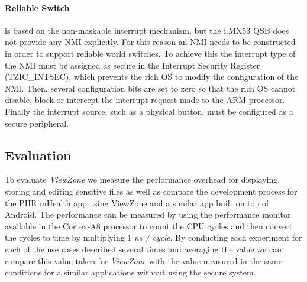 \paragraph{Reliable Switch} is based on the non-maskable interrupt mechanism, but the i.MX53 QSB does not provide any \ac{NMI} explicitly. For this reason an \ac{NMI} needs to be constructed in order to support reliable world switches. To achieve this the interrupt type of the \ac{NMI} must be assigned as secure in the Interrupt Security Register (TZIC\_INTSEC), which prevents the rich OS to modify the configuration of the \ac{NMI}. Then, several configuration bits are set to zero so that the rich OS cannot disable, block or intercept the interrupt request made to the ARM processor. Finally the interrupt source, such as a physical button, must be configured as a secure peripheral.


\subsection{Evaluation}


To evaluate \emph{ViewZone} we measure the performance overhead for displaying, storing and editing sensitive files as well as compare the development process for the PHR mHealth app using ViewZone and a similar app built on top of Android. The performance can be measured by using the performance monitor available in the Cortex-A8 processor to count the CPU cycles and then convert the cycles to time by multiplying 1 \emph{ns / cycle}. By conducting each experiment for each of the use cases described several times and averaging the value we can compare this value taken for \emph{ViewZone} with the value measured in the same conditions for a similar applications without using the secure system.



